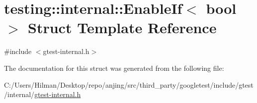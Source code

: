 \hypertarget{structtesting_1_1internal_1_1_enable_if}{}\section{testing\+:\+:internal\+:\+:Enable\+If$<$ bool $>$ Struct Template Reference}
\label{structtesting_1_1internal_1_1_enable_if}


{\ttfamily \#include $<$gtest-\/internal.\+h$>$}



The documentation for this struct was generated from the following file\+:\begin{DoxyCompactItemize}
\item 
C\+:/\+Users/\+Hilman/\+Desktop/repo/anjing/src/third\+\_\+party/googletest/include/gtest/internal/\hyperlink{gtest-internal_8h}{gtest-\/internal.\+h}\end{DoxyCompactItemize}
